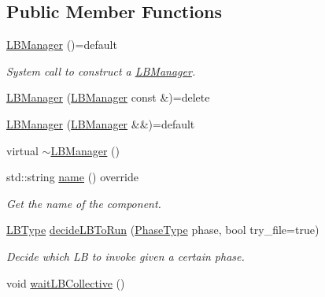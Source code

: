 \subsection*{Public Member Functions}
\begin{DoxyCompactItemize}
\item 
\hyperlink{structvt_1_1vrt_1_1collection_1_1balance_1_1_l_b_manager_a4adad6931af7d5ff2cb983859ed939f3}{L\+B\+Manager} ()=default
\begin{DoxyCompactList}\small\item\em System call to construct a {\ttfamily \hyperlink{structvt_1_1vrt_1_1collection_1_1balance_1_1_l_b_manager}{L\+B\+Manager}}. \end{DoxyCompactList}\item 
\hyperlink{structvt_1_1vrt_1_1collection_1_1balance_1_1_l_b_manager_af361eb6d3fa35d04873fcbe74b315d4a}{L\+B\+Manager} (\hyperlink{structvt_1_1vrt_1_1collection_1_1balance_1_1_l_b_manager}{L\+B\+Manager} const \&)=delete
\item 
\hyperlink{structvt_1_1vrt_1_1collection_1_1balance_1_1_l_b_manager_ab5efdf949166922f70cb49d171bf509a}{L\+B\+Manager} (\hyperlink{structvt_1_1vrt_1_1collection_1_1balance_1_1_l_b_manager}{L\+B\+Manager} \&\&)=default
\item 
virtual \hyperlink{structvt_1_1vrt_1_1collection_1_1balance_1_1_l_b_manager_aacec3c4ef45a173eae443722b2620d13}{$\sim$\+L\+B\+Manager} ()
\item 
std\+::string \hyperlink{structvt_1_1vrt_1_1collection_1_1balance_1_1_l_b_manager_a8e18e972cf9e8658da9577d45e090698}{name} () override
\begin{DoxyCompactList}\small\item\em Get the name of the component. \end{DoxyCompactList}\item 
\hyperlink{namespacevt_1_1vrt_1_1collection_1_1balance_ac4f99693509affcc67db182d4aad9b5c}{L\+B\+Type} \hyperlink{structvt_1_1vrt_1_1collection_1_1balance_1_1_l_b_manager_a6c610e1c053f986932d8a59bb89eb37d}{decide\+L\+B\+To\+Run} (\hyperlink{namespacevt_a46ce6733d5cdbd735d561b7b4029f6d7}{Phase\+Type} phase, bool try\+\_\+file=true)
\begin{DoxyCompactList}\small\item\em Decide which LB to invoke given a certain phase. \end{DoxyCompactList}\item 
void \hyperlink{structvt_1_1vrt_1_1collection_1_1balance_1_1_l_b_manager_a2923d77f512a955194589450cbb85b80}{wait\+L\+B\+Collective} ()

\end{DoxyCompactItemize}
